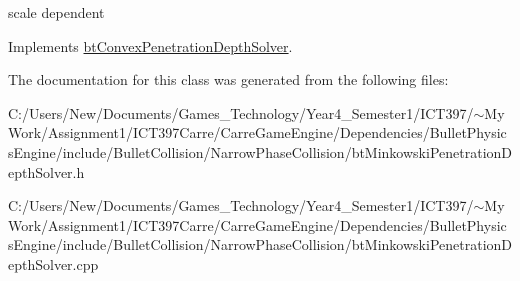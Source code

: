 scale dependent 

Implements \hyperlink{classbt_convex_penetration_depth_solver}{btConvexPenetrationDepthSolver}.

The documentation for this class was generated from the following files:\begin{CompactItemize}
\item 
C:/Users/New/Documents/Games\_\-Technology/Year4\_\-Semester1/ICT397/$\sim$My Work/Assignment1/ICT397Carre/CarreGameEngine/Dependencies/BulletPhysicsEngine/include/BulletCollision/NarrowPhaseCollision/btMinkowskiPenetrationDepthSolver.h\item 
C:/Users/New/Documents/Games\_\-Technology/Year4\_\-Semester1/ICT397/$\sim$My Work/Assignment1/ICT397Carre/CarreGameEngine/Dependencies/BulletPhysicsEngine/include/BulletCollision/NarrowPhaseCollision/btMinkowskiPenetrationDepthSolver.cpp\end{CompactItemize}
